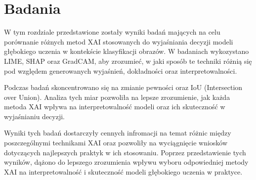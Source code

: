 
\chapter*{Badania}

W tym rozdziale przedstawione zostały wyniki badań mających na celu porównanie różnych metod XAI stosowanych do wyjaśniania decyzji modeli głębokiego uczenia w kontekście klasyfikacji obrazów.
W badaniach wykozystano LIME, SHAP oraz GradCAM, aby zrozumieć, w jaki sposób te techniki różnią się pod względem generowanych wyjaśnień, dokładności oraz interpretowalności.

Podczas badań skoncentrowano się na zmianie pewności oraz IoU (Intersection over Union).
Analiza tych miar pozwoliła na lepsze zrozumienie, jak każda metoda XAI wpływa na interpretowalność modeli oraz ich skuteczność w wyjaśnianiu decyzji.

Wyniki tych badań dostarczyły cennych infromacji na temat różnic między poszczególnymi technikami XAI oraz pozwoliły na wyciągnięcie wniosków dotyczących najlepszych praktyk w ich stosowaniu.
Poprzez przedstawienie tych wyników, dążono do lepszego zrozumienia wpływu wyboru odpowiedniej metody XAI na interpretowalność i skuteczność modeli głębokiego uczenia w praktyce.







%

%


